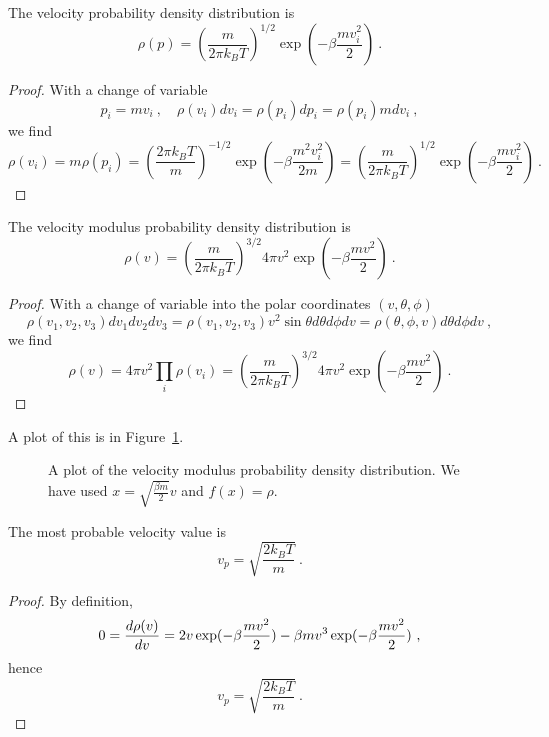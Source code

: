     The velocity probability density distribution is
    \begin{equation*}
        \rho(p) = (\frac{m}{2\pi k_B T})^{1/2} \exp(- \beta \frac{m v^2_i}{2}) ~.
    \end{equation*}
    \begin{proof}
        With a change of variable 
        \begin{equation*}
            p_i = m v_i ~, \quad \rho(v_i) dv_i = \rho(p_i) dp_i = \rho(p_i) m dv_i ~,
        \end{equation*}
        we find
        \begin{equation*}
            \rho(v_i) = m \rho (p_i) = (\frac{2\pi k_B T}{m})^{-1/2} \exp(- \beta \frac{m^2 v^2_i}{2m}) = (\frac{m}{2\pi k_B T})^{1/2} \exp(- \beta \frac{m v^2_i}{2}) ~.
        \end{equation*}
    \end{proof}

    The velocity modulus probability density distribution is 
    \begin{equation*}
        \rho (v) = (\frac{m}{2\pi k_B T})^{3/2} 4 \pi v^2 \exp(- \beta \frac{m v^2}{2}) ~.
    \end{equation*}
    \begin{proof}
        With a change of variable into the polar coordinates $(v, \theta, \phi)$
        \begin{equation*}
            \rho(v_1, v_2, v_3) dv_1 dv_2 dv_3 = \rho(v_1, v_2, v_3) v^2 \sin \theta d\theta d\phi dv = \rho(\theta, \phi, v) d\theta d\phi dv ~,
        \end{equation*}
        we find
        \begin{equation*}
            \rho(v) = 4 \pi v^2 \prod_i \rho (v_i) = (\frac{m}{2\pi k_B T})^{3/2} 4 \pi v^2 \exp(- \beta \frac{m v^2}{2})  ~.
        \end{equation*}
    \end{proof}
    A plot of this is in Figure~\ref{max:vel}.
    \begin{figure}
        \centering
        \caption{A plot of the velocity modulus probability density distribution. We have used $x = \sqrt{\frac{\beta m}{2}} v$ and $f(x) = \rho$.}
        \label{max:vel}
    \end{figure}

    The most probable velocity value is 
    \begin{equation*}
        v_p = \sqrt{\frac{2 k_B T}{m}} ~.
    \end{equation*}
    \begin{proof}
        By definition, 
        \begin{equation*}
            0 = \frac{d\rho(v)}{dv} = 2 v \exp(- \beta \frac{m v^2}{2}) - \beta m v^3 \exp(- \beta \frac{m v^2}{2}) ~,
        \end{equation*}
        hence 
        \begin{equation*}
            v_p = \sqrt{\frac{2k_B T}{m}} ~.
        \end{equation*}
    \end{proof}

